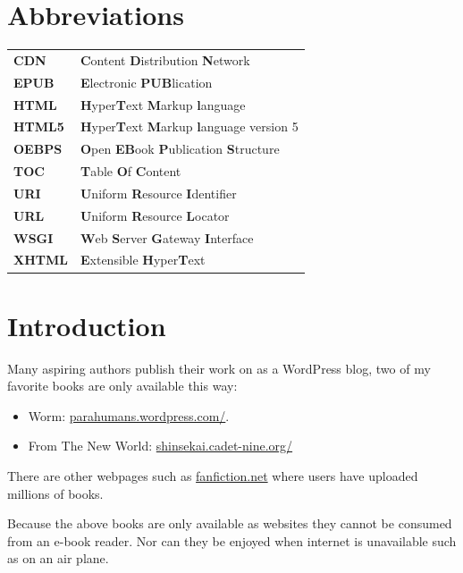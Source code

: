 \documentclass[]{report}   %
\begin{document}
\chapter*{Abbreviations}
\begin{tabular}{ l l }
	\textbf{CDN}   & \textbf{C}ontent \textbf{D}istribution \textbf{N}etwork  \\
	\textbf{EPUB}  & \textbf{E}lectronic \textbf{PUB}lication  \\
	\textbf{HTML}  & \textbf{H}yper\textbf{T}ext \textbf{M}arkup \textbf{l}anguage \\
	\textbf{HTML5} & \textbf{H}yper\textbf{T}ext \textbf{M}arkup \textbf{l}anguage 
					 version 5 \\
	\textbf{OEBPS} & \textbf{O}pen \textbf{EB}ook \textbf{P}ublication \textbf{S}tructure \\
	\textbf{TOC}   & \textbf{T}able \textbf{O}f \textbf{C}ontent  \\
	\textbf{URI}   & \textbf{U}niform \textbf{R}esource \textbf{I}dentifier \\
	\textbf{URL}   & \textbf{U}niform \textbf{R}esource \textbf{L}ocator \\
    \textbf{WSGI}  & \textbf{W}eb \textbf{S}erver \textbf{G}ateway \textbf{I}nterface \\
	\textbf{XHTML} & \textbf{E}xtensible \textbf{H}yper\textbf{T}ext \\
\end{tabular}

\chapter{Introduction}           
Many aspiring authors publish their work on as a WordPress blog, two
of my favorite books are only available this way:
\begin{itemize}
	\item Worm\cite{worm}: \url{parahumans.wordpress.com/}.
	\item From The New World\cite{from_the_new_world}: \url{shinsekai.cadet-nine.org/} 
\end{itemize}
There are other webpages such as \url{fanfiction.net} where users have uploaded millions of books.

Because the above books are only available as websites they cannot be consumed
from an e-book reader. Nor can they be enjoyed when internet is unavailable such
as on an air plane.
\end{document}
